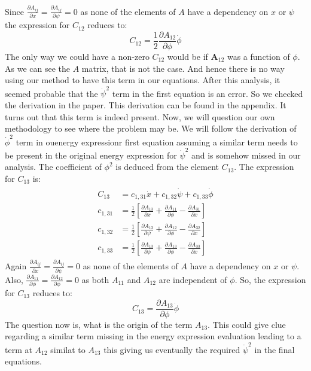 \documentclass[a4paper,10pt]{article}
\begin{document}
\begin{itemize}
Since $\frac{\partial A_{ij}}{\partial x} = \frac{\partial A_{ij}}{\partial \psi} = 0$ as none of the elements of $A$ have a dependency on $x$ or $\psi$
the expression for $C_{12}$ reduces to:
\[
 C_{12} = \frac{1}{2}\frac{\partial A_{12}}{\partial \phi}\dot{\phi}
\]
The only way we could have a non-zero $C_{12}$ would be if $\mathbf{A}_{12}$ was a function of $\phi$. As we can see the $A$ matrix, 
that is not the case. And hence there is no way using our method to have this term in our equations.
After this analysis, it seemed probable that the $\dot\psi^2$ term in the first equation is an error. So we checked the derivation
in the paper. This derivation can be found in the appendix. It turns out that this term is indeed present.
Now, we will question our own methodology to see where the problem may be. We will follow the derivation of $\dot\phi^2$ term in ouenergy expressionr
first equation assuming a similar term needs to be present in the original energy expression for $\dot\psi^2$ and is somehow missed
in our analysis.
The coefficient of $\phi^2$ is deduced from the element $C_{13}$. The expression for $C_{13}$ is:
\begin{align}
\begin{split}
 C_{13} &= c_{1,31}\dot{x} + c_{1,32}\dot{\psi} + c_{1,33}\dot{\phi} \\
 c_{1,31} &= \frac{1}{2}\left[\frac{\partial A_{13}}{\partial x} + \frac{\partial A_{11}}{\partial \phi} - \frac{\partial A_{31}}{\partial x}\right] \\
 c_{1,32} &= \frac{1}{2}\left[\frac{\partial A_{13}}{\partial \psi} + \frac{\partial A_{12}}{\partial \phi} - \frac{\partial A_{32}}{\partial x}\right] \\
 c_{1,33} &= \frac{1}{2}\left[\frac{\partial A_{13}}{\partial \phi} + \frac{\partial A_{13}}{\partial \phi} - \frac{\partial A_{33}}{\partial x}\right]
\end{split}
\end{align}
Again $\frac{\partial A_{ij}}{\partial x} = \frac{\partial A_{ij}}{\partial \psi} = 0$ as none of the elements of $A$ have a dependency on $x$ or $\psi$.
Also, $\frac{\partial A_{11}}{\partial \phi} = \frac{\partial A_{12}}{\partial \phi} = 0$ as both $A_{11}$ and $A_{12}$ are independent of $\phi$. So,
the expression for $C_{13}$ reduces to:
\[
 C_{13} = \frac{\partial A_{13}}{\partial \phi}\dot{\phi}
\]
The question now is, what is the origin of the term $A_{13}$. This could give clue regarding a similar term missing in the energy expression evaluation
leading to a term at $A_{12}$ similat to $A_{13}$ this giving us eventually the required $\dot\psi^2$ in the final equations.

\end{itemize}
\end{document}
